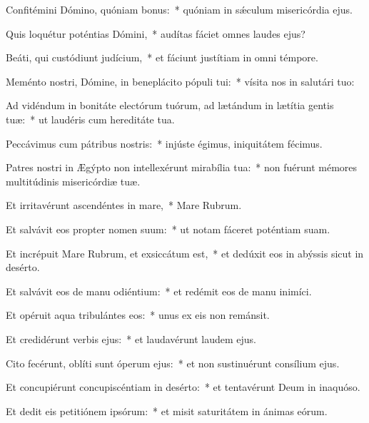 \item Confitémini Dómino, quóniam bonus:~* quóniam in sǽculum misericórdia ejus.

\item Quis loquétur poténtias Dómini,~* audítas fáciet omnes laudes ejus?

\item Beáti, qui custódiunt judícium,~* et fáciunt justítiam in omni témpore.

\item Meménto nostri, Dómine, in beneplácito pópuli tui:~* vísita nos in salutári tuo:

\item Ad vidéndum in bonitáte electórum tuórum, ad lætándum in lætítia gentis tuæ:~* ut laudéris cum hereditáte tua.

\item Peccávimus cum pátribus nostris:~* injúste égimus, iniquitátem fécimus.

\item Patres nostri in Ægýpto non intellexérunt mirabília tua:~* non fuérunt mémores multitúdinis misericórdiæ tuæ.

\item Et irritavérunt ascendéntes in mare,~* Mare Rubrum.

\item Et salvávit eos propter nomen suum:~* ut notam fáceret poténtiam suam.

\item Et incrépuit Mare Rubrum, et exsiccátum est,~* et dedúxit eos in abýssis sicut in desérto.

\item Et salvávit eos de manu odiéntium:~* et redémit eos de manu inimíci.

\item Et opéruit aqua tribulántes eos:~* unus ex eis non remánsit.

\item Et credidérunt verbis ejus:~* et laudavérunt laudem ejus.

\item Cito fecérunt, oblíti sunt óperum ejus:~* et non sustinuérunt consílium ejus.

\item Et concupiérunt concupiscéntiam in desérto:~* et tentavérunt Deum in inaquóso.

\item Et dedit eis petitiónem ipsórum:~* et misit saturitátem in ánimas eórum.

